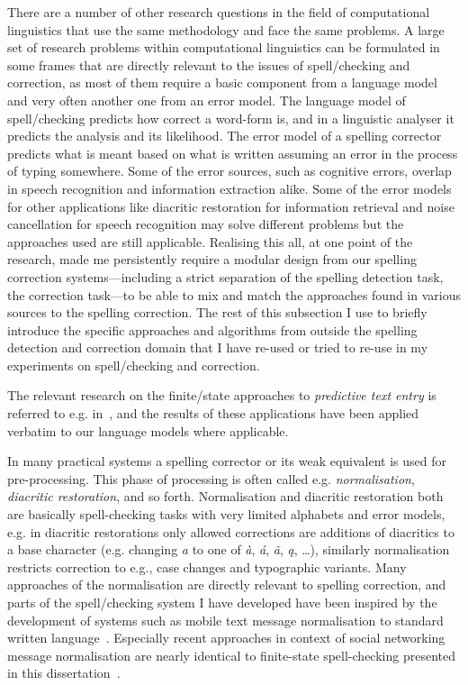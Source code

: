 \documentclass[officiallayout,final]{unihelcompling}
\begin{document}
There are a number of other research questions in the field of computational
linguistics that use the same methodology and face the same problems. A large
set of research problems within computational linguistics can be formulated in
some frames that are directly relevant to the issues of spell\-/checking and
correction, as most of them require a basic component from a language model and
very often another one from an error model. The language model of
spell\-/checking predicts how correct a word-form is, and in a linguistic
analyser it predicts the analysis and its likelihood. The error model of a
spelling corrector predicts what is meant based on what is written assuming an
error in the process of typing somewhere. Some of the error sources, such as
cognitive errors, overlap in speech recognition and information extraction
alike. Some of the error models for other applications like diacritic
restoration for information retrieval and noise cancellation for speech
recognition may solve different problems but the approaches used are still
applicable. Realising this all, at one point of the research, made me
persistently require a modular design from our spelling correction
systems---including a strict separation of the spelling detection task, the
correction task---to be able to mix and match the approaches found in various
sources to the spelling correction. The rest of this subsection I use to
briefly introduce the specific approaches and algorithms from outside the
spelling detection and correction domain that I have re-used or tried to
re-use in my experiments on spell\-/checking and correction.

The relevant research on the finite\-/state approaches to \emph{predictive text
entry} is referred to e.g. in~\citet{silfverberg2010partofspeech}, and the
results of these applications have been applied verbatim to our language models
where applicable.

In many practical systems a spelling corrector or its weak equivalent is used
for pre-processing. This phase of processing is often called e.g.
\emph{normalisation}, \emph{diacritic restoration}, and so forth. Normalisation
and diacritic restoration both are basically spell-checking tasks with very
limited alphabets and error models, e.g. in diacritic restorations only allowed
corrections are additions of diacritics to a base character (e.g. changing
\emph{a} to one of \emph{à}, \emph{á}, \emph{ã}, \emph{ą}, \ldots), similarly
normalisation restricts correction to e.g., case changes and typographic
variants.  Many approaches of the normalisation are directly relevant to
spelling correction, and parts of the spell\-/checking system I have developed
have been inspired by the development of systems such as mobile text message
normalisation to standard written language~\citep{kobus2008normalizing}.
Especially recent approaches in context of social networking message
normalisation are nearly identical to finite-state spell-checking presented in
this dissertation~\citep{hulden2013weighted}.
\end{document}
